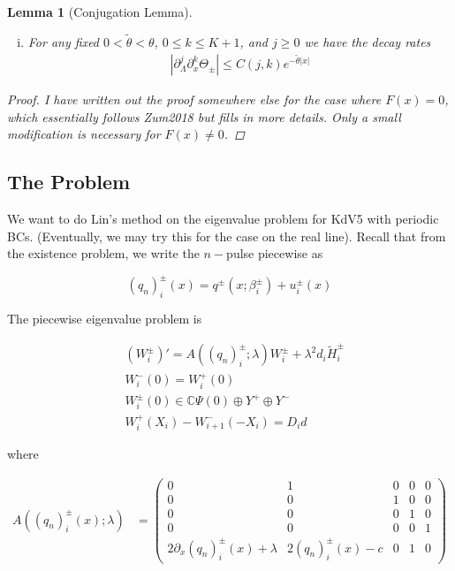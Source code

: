 \documentclass[12pt]{article}
\def\C{{\mathbb C}}
\newtheorem{lemma}{Lemma}
\begin{document}
\begin{lemma}[Conjugation Lemma]
\begin{enumerate}[(i)]
where

\[
G(x; \Lambda) = P_\pm (x, \Lambda)^{-1} F(x)
\]

\item For any fixed $0 < \tilde{\theta} < \theta$, $0 \leq k \leq K+1$, and $j \geq 0$ we have the decay rates
\begin{align*}
\left| \partial_\Lambda^j \partial_x^k \Theta_\pm \right| \leq C(j, k)e^{-\tilde{\theta}|x|}
\end{align*}
\end{enumerate}
\begin{proof}
I have written out the proof somewhere else for the case where $F(x) = 0$, which essentially follows Zum2018 but fills in more details. Only a small modification is necessary for $F(x) \neq 0$.
\end{proof}
\end{lemma}

\subsection*{The Problem}

We want to do Lin's method on the eigenvalue problem for KdV5 with periodic BCs. (Eventually, we may try this for the case on the real line). Recall that from the existence problem, we write the $n-$pulse piecewise as

\[
(q_n)_i^\pm(x) = q^\pm(x; \beta_i^\pm) + u_i^\pm(x)
\]

The piecewise eigenvalue problem is

\begin{align*}
&(W_i^\pm)' = A( (q_n)_i^\pm; \lambda ) W_i^\pm + \lambda^2 d_i \tilde{H}_i^\pm \\
&W_i^-(0) = W_i^+(0) \\
&W_i^\pm(0) \in \C \Psi(0) \oplus Y^+ \oplus Y^- \\
&W_i^+(X_i) - W_{i+1}^-(-X_i) = D_i d
\end{align*}

where

\begin{align*}
A((q_n)_i^\pm(x); \lambda) &=  \begin{pmatrix}0 & 1 & 0 & 0 & 0 \\0 & 0 & 1 & 0 & 0 \\0 & 0 & 0 & 1 & 0 \\0 & 0 & 0 & 0 & 1 \\
2 \partial_x (q_n)_i^\pm(x) + \lambda & 2 (q_n)_i^\pm(x) - c & 0 & 1 & 0 \end{pmatrix}
\end{align*}
\end{document}
